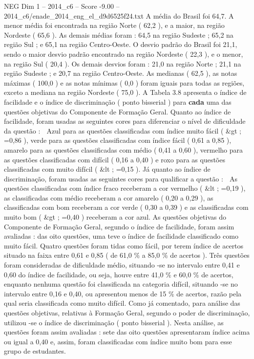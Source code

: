 \begin{textsample}{NEG Dim 1 – 2014\_c6 – Score -9.00 – 2014\_c6/enade\_2014\_eng\_el\_d9d6525f24.txt}
A média do Brasil foi 64,7.
A menor média foi encontrada na região Norte ( 62,2 ), e a maior, na região Nordeste ( 65,6 ).
As demais médias foram : 64,5 na região Sudeste ; 65,2 na região Sul ; e 65,1 na região Centro-Oeste.
O desvio padrão do Brasil foi 21,1, sendo o maior desvio padrão encontrado na região Nordeste ( 22,3 ), e o menor, na região Sul ( 20,4 ).
Os demais desvios foram : 21,0 na região Norte ; 21,1 na região Sudeste ; e 20,7 na região Centro-Oeste.
As medianas ( 62,5 ), as notas máximas ( 100,0 ) e as notas mínimas ( 0,0 ) foram iguais para todas as regiões, exceto a mediana na região Nordeste ( 75,0 ).
A Tabela 3.8 apresenta o índice de facilidade e o índice de discriminação ( ponto bisserial ) para \textbf{cada} uma das questões objetivas do Componente de Formação Geral.
Quanto ao índice de facilidade, foram usadas as seguintes cores para diferenciar o nível de dificuldade da questão :  Azul para as questões classificadas com índice muito fácil ( \&gt ; =0,86 ), verde para as questões classificadas com índice fácil ( 0,61 a 0,85 ), amarelo para as questões classificadas com médio ( 0,41 a 0,60 ), vermelho para as questões classificadas com difícil ( 0,16 a 0,40 ) e roxo para as questões classificadas com muito difícil ( \&lt ; =0,15 ).
Já quanto ao índice de discriminação, foram usadas as seguintes cores para qualificar a questão :  As questões classificadas com índice fraco receberam a cor vermelho ( \&lt ; =0,19 ), as classificadas com médio receberam a cor amarelo ( 0,20 a 0,29 ), as classificadas com bom receberam a cor verde ( 0,30 a 0,39 ) e as classificadas com muito bom ( \&gt ; =0,40 ) receberam a cor azul.
As questões objetivas do Componente de Formação Geral, segundo o índice de facilidade, foram assim avaliadas : das oito questões, uma teve o índice de facilidade classificado como muito fácil.
Quatro questões foram tidas como fácil, por terem índice de acertos situado na faixa entre 0,61 e 0,85 ( de 61,0 \% a 85,0 \% de acertos ).
Três questões foram consideradas de dificuldade médio, situando -se no intervalo entre 0,41 e 0,60 do índice de facilidade, ou seja, houve entre 41,0 \% e 60,0 \% de acertos, enquanto nenhuma questão foi classificada na categoria difícil, situando -se no intervalo entre 0,16 e 0,40, ou apresentou menos de 15 \% de acertos, razão pela qual seria classificada como muito difícil.
Como já comentado, para análise das questões objetivas, relativas à Formação Geral, segundo o poder de discriminação, utilizou -se o índice de discriminação ( ponto bisserial ).
Nesta análise, as questões foram assim avaliadas : sete das oito questões apresentaram índice acima ou igual a 0,40 e, assim, foram classificadas com índice muito bom para esse grupo de estudantes.

\end{textsample}
